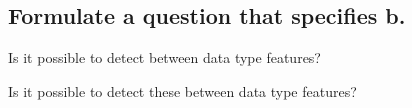 \subsection{Formulate a question that specifies b.}

Is it possible to detect between data type features?

Is it possible to detect these between data type features?
